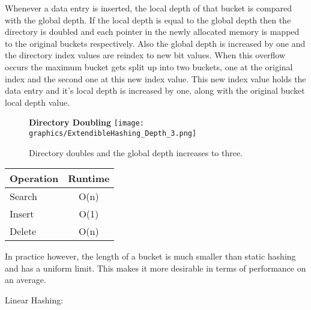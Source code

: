 \documentclass[letterpaper, 12pt]{article}
\begin{document}
Whenever a data entry is inserted, the local depth of that bucket is compared with the global depth. If the local depth
is equal to the global depth then the directory is doubled and each pointer in the newly allocated memory is mapped to the
original buckets respectively. Also the global depth is increased by one and the directory index values are reindex to new
bit values. When this overflow occurs the maximum bucket gets split up into two buckets, one at the original index and the 
second one at this new index value. This new index value holds the data entry and it's local depth is increased by one, along with
the original bucket local depth value.

\begin{figure}
  \textbf{Directory Doubling}
  \texttt{[image: graphics/ExtendibleHashing\_Depth\_3.png]}
  \caption{Directory doubles and the global depth increases to three.}
\end{figure}

\begin{center}
\begin{tabular}{l | c }
  \hline
  Operation & Runtime \\ \hline \hline
  Search & O(n) \\ \hline
  Insert & O(1) \\ \hline
  Delete & O(n) \\ \hline
\end{tabular}
\end{center}

In practice however, the length of a bucket is much smaller than static hashing and has 
a uniform limit. This makes it more desirable in terms of performance on an average.

Linear Hashing:
\end{document}
